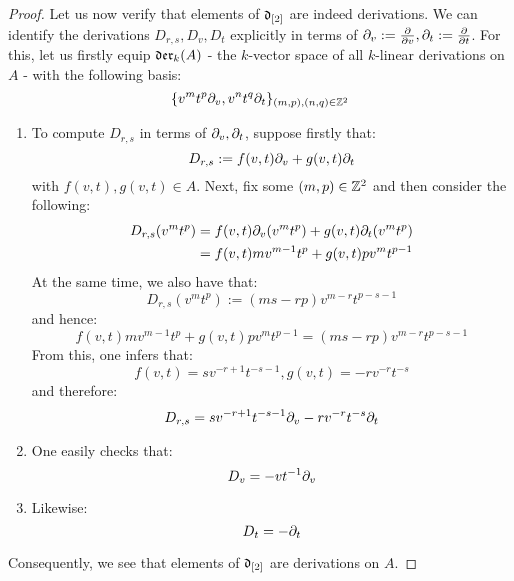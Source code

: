 \begin{proof}
                Let us now verify that elements of $\mathfrak{d}_{[2]}$ are indeed derivations. We can identify the derivations $D_{r, s}, D_v, D_t$ explicitly in terms of $\partial_v := \frac{\partial}{\partial v}, \partial_t := \frac{\partial}{\partial t}$. For this, let us firstly equip $\mathfrak{der}_k(A)$ - the $k$-vector space of all $k$-linear derivations on $A$ - with the following basis:
                    $$\{ v^m t^p \partial_v, v^n t^q \partial_t \}_{(m, p), (n, q) \in \mathbb{Z}^2}$$
                \begin{enumerate}
                    \item To compute $D_{r, s}$ in terms of $\partial_v, \partial_t$, suppose firstly that:
                        $$D_{r, s} := f(v, t) \partial_v + g(v, t) \partial_t$$
                    with $f(v, t), g(v, t) \in A$. Next, fix some $(m, p) \in \mathbb{Z}^2$ and then consider the following:
                        $$
                            \begin{aligned}
                                D_{r, s}( v^m t^p ) & = f(v, t) \partial_v( v^m t^p ) + g(v, t) \partial_t( v^m t^p )
                                \\
                                & = f(v, t) m v^{m - 1} t^p + g(v, t) p v^m t^{p - 1}
                            \end{aligned}
                        $$
                    At the same time, we also have that:
                        $$D_{r, s}(v^m t^p) := ( ms - rp ) v^{m - r} t^{p - s - 1}$$
                    and hence:
                        $$f(v, t) m v^{m - 1} t^p + g(v, t) p v^m t^{p - 1} = ( ms - rp ) v^{m - r} t^{p - s - 1}$$
                    From this, one infers that:
                        $$f(v, t) = s v^{-r + 1} t^{-s - 1}, g(v, t) = -r v^{-r} t^{-s}$$
                    and therefore:
                        $$D_{r, s} = s v^{-r + 1} t^{-s - 1} \partial_v - r v^{-r} t^{-s} \partial_t$$
                    \item One easily checks that:
                        $$D_v = -v t^{-1} \partial_v$$
                    \item Likewise:
                        $$D_t = -\partial_t$$
                \end{enumerate}
                Consequently, we see that elements of $\mathfrak{d}_{[2]}$ are derivations on $A$.
            \end{proof}
